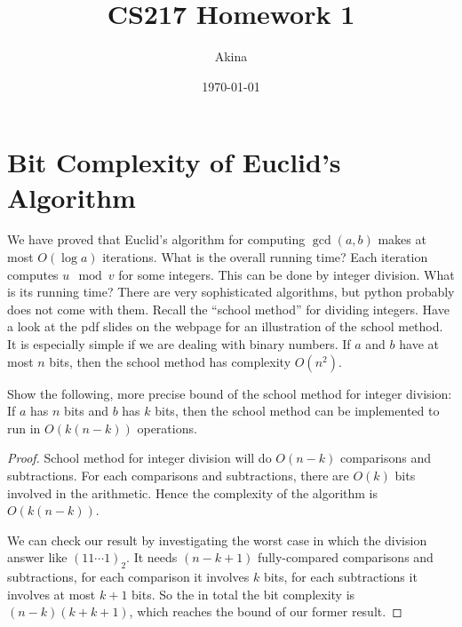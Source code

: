 \documentclass[11pt,a4paper,oneside]{article}
\renewcommand{\hwtitle} {CS217 Homework 1}
\renewcommand{\hwauthor}{Akina}
\renewcommand{\hwdate}{\today}
\begin{document}
\title{\hwtitle}
\author{\hwauthor}
\date{\hwdate}
\maketitle

\section*{Bit Complexity of Euclid's Algorithm}
We have proved that Euclid's algorithm for computing $\gcd(a,b)$ makes at most
$O(\log a)$ iterations. What is the overall running time? Each iteration computes
$u \mod v$ for some integers. This can be done by integer division. What is its running time?
There are very sophisticated algorithms, but python probably does not come with them. 
Recall the ``school method'' for dividing integers. Have a look at the pdf slides on the 
webpage for an illustration of the school method. It is especially simple if we are dealing
with binary numbers. If $a$ and $b$ have at most $n$ bits, then the school method 
has complexity $O(n^2)$.

\begin{problem}{1}
	\statement
	Show the following, more precise bound of the school method for integer division:
	If $a$ has $n$ bits and $b$ has $k$ bits, then the school method can be implemented
	to run in $O( k(n-k))$ operations.
	\solution
	\begin{proof}
	School method for integer division will do $O( n - k )$ comparisons and subtractions. For each comparisons and subtractions, there are  $O(k)$ bits involved in the arithmetic. Hence the complexity of the algorithm is \( O(k(n - k))\).

	We can check our result by investigating the worst case in which the division answer like $(11\cdots1)_2$. It needs $(n - k + 1)$ fully-compared comparisons and subtractions, for each comparison it involves $k$ bits, for each subtractions it involves at most $k + 1$ bits. So the in total the bit complexity is $(n - k)(k + k + 1)$, which reaches the bound of our former result.

	\end{proof}
\end{problem}
\end{document}
